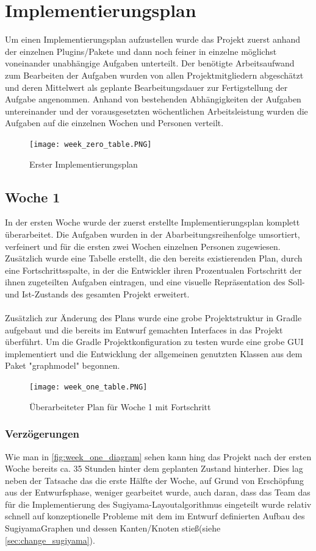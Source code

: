 \chapter{Implementierungsplan}
\label{ch:implplan}
Um einen Implementierungsplan aufzustellen wurde das Projekt zuerst anhand der einzelnen Plugins/Pakete und dann noch feiner in einzelne möglichst voneinander unabhängige Aufgaben unterteilt. Der benötigte Arbeitsaufwand zum Bearbeiten der Aufgaben wurden von allen Projektmitgliedern abgeschätzt und deren Mittelwert als geplante Bearbeitungsdauer zur Fertigstellung der Aufgabe angenommen. Anhand von bestehenden Abhängigkeiten der Aufgaben untereinander und der vorausgesetzten wöchentlichen Arbeitsleistung wurden die Aufgaben auf die einzelnen Wochen und Personen verteilt. \\
\begin{figure}[!htbp]
	\centering
	\texttt{[image: week\_zero\_table.PNG]}
	\caption{Erster Implementierungsplan}
	\label{fig:week_zero_table}
\end{figure}
\newpage
\section{Woche 1}
In der ersten Woche wurde der zuerst erstellte Implementierungsplan komplett überarbeitet. Die Aufgaben wurden in der Abarbeitungsreihenfolge umsortiert, verfeinert und für die ersten zwei Wochen einzelnen Personen zugewiesen. Zusätzlich wurde eine Tabelle erstellt, die den bereits existierenden Plan, durch eine Fortschrittsspalte, in der die Entwickler ihren Prozentualen Fortschritt der ihnen zugeteilten Aufgaben eintragen, und eine visuelle Repräsentation des Soll- und Ist-Zustands des gesamten Projekt erweitert.\\
\\
Zusätzlich zur Änderung des Plans wurde eine grobe Projektstruktur in Gradle aufgebaut und die bereits im Entwurf gemachten Interfaces in das Projekt überführt. Um die Gradle Projektkonfiguration zu testen wurde eine grobe GUI implementiert und die Entwicklung der allgemeinen genutzten Klassen aus dem Paket "graphmodel"  begonnen.

\begin{figure}[!htbp]
	\centering
	\texttt{[image: week\_one\_table.PNG]}
	\caption{Überarbeiteter Plan für Woche 1 mit Fortschritt}
	\label{fig:week_one_table}
\end{figure}

\subsection{Verzögerungen}
Wie man in \ref{fig:week_one_diagram} sehen kann hing das Projekt nach der ersten Woche bereits ca. 35 Stunden hinter dem geplanten Zustand hinterher.
Dies lag neben der Tatsache das die erste Hälfte der Woche, auf Grund von Erschöpfung aus der Entwurfsphase, weniger gearbeitet wurde, auch daran, dass das Team das für die Implementierung des Sugiyama-Layoutalgorithmus eingeteilt wurde relativ schnell auf konzeptionelle Probleme mit dem im Entwurf definierten Aufbau des SugiyamaGraphen und dessen Kanten/Knoten stieß(siehe \ref{sec:change_sugiyama}).

